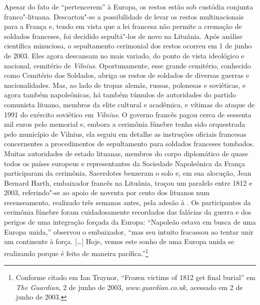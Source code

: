 Apesar do fato de ``pertencerem'' à Europa, os restos estão sob custódia
conjunta franco"-lituana. Descartou"-se a possibilidade de levar os restos
multinacionais para a França e, tendo em vista que a lei francesa não
permite a cremação de soldados franceses, foi decidido sepultá"-los de
novo na Lituânia. Após análise científica minuciosa, o sepultamento
cerimonial dos restos ocorreu em 1 de junho de 2003. Eles agora
descansam no mais variado, do ponto de vista ideológico e nacional,
cemitério de \textit{Vilnius}. Oportunamente, esse grande cemitério, conhecido
como Cemitério dos Soldados, abriga os restos de soldados de diversas
guerras e nacionalidades. Mas, ao lado de tropas alemãs, russas,
polonesas e soviéticas, e agora também napoleônicas, há também túmulos
de autoridades do partido comunista lituano, membros da elite cultural e
acadêmica, e vítimas do ataque de 1991 do exército soviético em \textit{Vilnius}.
O governo francês pagou cerca de sessenta mil euros pelo memorial e,
embora a cerimônia fúnebre tenha sido orquestrada pelo município de
Vilnius, ela seguiu em detalhe as instruções oficiais francesas
concernentes a procedimentos de sepultamento para soldados franceses
tombados. Muitas autoridades de estado lituanas, membros do corpo
diplomático de quase todos os países europeus e representantes da
Sociedade Napoleônica da França participaram da cerimônia. Sacerdotes
benzeram o solo e, em sua alocução, Jean Bernard Harth, embaixador
francês na Lituânia, traçou um paralelo entre 1812 e 2003, referindo"-se
ao apoio de noventa por cento dos lituanos num recenseamento, realizado
três semanas antes, pela adesão à . Os participantes da cerimônia
fúnebre foram cuidadosamente recordados das falácias da guerra e dos
perigos de uma integração forçada da Europa: ``Napoleão estava em busca
de uma Europa unida,'' observou o embaixador, ``mas seu intuito
fracassou ao tentar unir um continente à força. [\ldots{}] Hoje, vemos
este sonho de uma Europa unida se realizando porque é feito de maneira
pacífica.''\footnote{Conforme citado em Ian Traynor, ``Frozen victims of 1812 get final burial'' em \textit{The Guardian}, 2 de junho de 2003, \textit{www.guardian.co.uk,} acessado em 2 de junho de 2003.}


